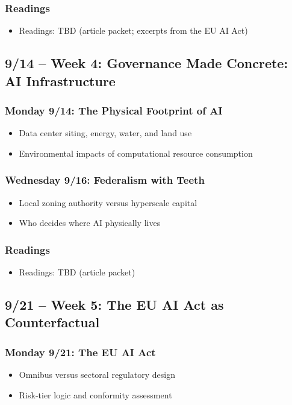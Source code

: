\documentclass[12pt]{article}
\begin{document}
    \subsubsection*{Readings}
        \begin{itemize}
            \item Readings: TBD (article packet; excerpts from the EU AI Act)
        \end{itemize}

\subsection*{9/14 -- Week 4: Governance Made Concrete: AI Infrastructure}
    \subsubsection*{Monday 9/14: The Physical Footprint of AI}
        \begin{itemize}
            \item Data center siting, energy, water, and land use
            \item Environmental impacts of computational resource consumption
        \end{itemize}
    \subsubsection*{Wednesday 9/16: Federalism with Teeth}
        \begin{itemize}
            \item Local zoning authority versus hyperscale capital
            \item Who decides where AI physically lives
        \end{itemize}
    \subsubsection*{Readings}
        \begin{itemize}
            \item Readings: TBD (article packet)
        \end{itemize}

\subsection*{9/21 -- Week 5: The EU AI Act as Counterfactual}
    \subsubsection*{Monday 9/21: The EU AI Act}
        \begin{itemize}
            \item Omnibus versus sectoral regulatory design
            \item Risk-tier logic and conformity assessment
        \end{itemize}
\end{document}
